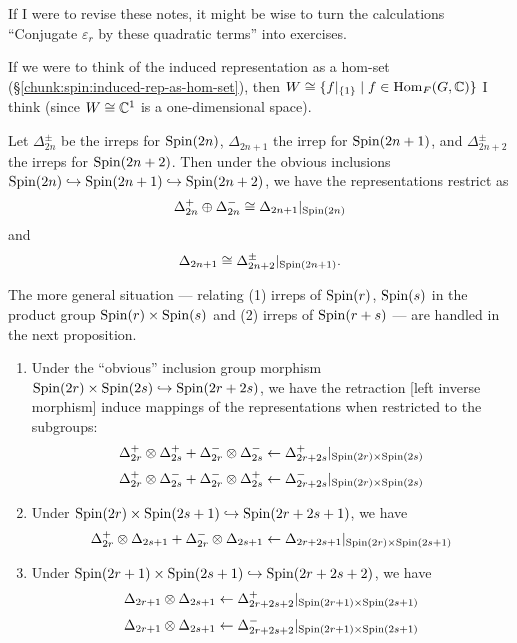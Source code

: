 \begin{remark}
If I were to revise these notes, it might be wise to turn the
calculations ``Conjugate $\varepsilon_{r}$ by these quadratic terms''
into exercises.
\end{remark}

\begin{remark}
If we were to think of the induced representation as a hom-set (\S\ref{chunk:spin:induced-rep-as-hom-set}),
then $W\cong\{f|_{\{1\}}\mid f\in\operatorname{Hom}_{F}(G,\mathbb{C})\}$ I think (since
$W\cong\mathbb{C}^{1}$ is a one-dimensional space).
\end{remark}

\begin{proposition}\label{prop:spin:spinor-rep-inclusion}
Let $\Delta^{\pm}_{2n}$ be the irreps for $\operatorname{Spin}(2n)$, $\Delta_{2n+1}$
the irrep for $\operatorname{Spin}(2n+1)$, and $\Delta^{\pm}_{2n+2}$ the irreps for
$\operatorname{Spin}(2n+2)$. Then under the obvious inclusions
$\operatorname{Spin}(2n)\hookrightarrow\operatorname{Spin}(2n+1)\hookrightarrow\operatorname{Spin}(2n+2)$, we have the representations
restrict as
\[ \Delta^{+}_{2n}\oplus\Delta^{-}_{2n} \cong \Delta_{2n+1}|_{\operatorname{Spin}(2n)} \]
and
\[ \Delta_{2n+1} \cong \Delta^{\pm}_{2n+2}|_{\operatorname{Spin}(2n+1)}. \]
\end{proposition}

The more general situation --- relating (1) irreps of $\operatorname{Spin}(r)$, $\operatorname{Spin}(s)$
in the product group $\operatorname{Spin}(r)\times\operatorname{Spin}(s)$ and (2) irreps of $\operatorname{Spin}(r+s)$
--- are handled in the next proposition.

\begin{proposition}
\begin{enumerate}
\item Under the ``obvious'' inclusion group morphism
  $\operatorname{Spin}(2r)\times\operatorname{Spin}(2s)\hookrightarrow\operatorname{Spin}(2r+2s)$, we have the retraction
  [left inverse morphism] induce mappings of the representations when
  restricted to the subgroups:
  \[ \Delta_{2r}^{+}\otimes\Delta_{2s}^{+} + \Delta^{-}_{2r}\otimes\Delta^{-}_{2s}
\gets \Delta_{2r+2s}^{+}|_{\operatorname{Spin}(2r)\times\operatorname{Spin}(2s)} \]
  \[ \Delta_{2r}^{+}\otimes\Delta_{2s}^{-} + \Delta^{-}_{2r}\otimes\Delta^{+}_{2s}
\gets \Delta_{2r+2s}^{-}|_{\operatorname{Spin}(2r)\times\operatorname{Spin}(2s)} \]
\item Under $\operatorname{Spin}(2r)\times\operatorname{Spin}(2s + 1)\hookrightarrow\operatorname{Spin}(2r+2s + 1)$, we have
  \[ \Delta_{2r}^{+}\otimes\Delta_{2s+1} + \Delta^{-}_{2r}\otimes\Delta_{2s+1}
\gets \Delta_{2r+2s+1}|_{\operatorname{Spin}(2r)\times\operatorname{Spin}(2s+1)} \]
\item Under $\operatorname{Spin}(2r+1)\times\operatorname{Spin}(2s+1)\hookrightarrow\operatorname{Spin}(2r+2s+2)$, we have
  \[ \Delta_{2r+1}\otimes\Delta_{2s+1}
\gets \Delta_{2r+2s+2}^{+}|_{\operatorname{Spin}(2r+1)\times\operatorname{Spin}(2s+1)} \]
  \[ \Delta_{2r+1}\otimes\Delta_{2s+1}
\gets \Delta_{2r+2s+2}^{-}|_{\operatorname{Spin}(2r+1)\times\operatorname{Spin}(2s+1)} \]
\end{enumerate}
\end{proposition}

